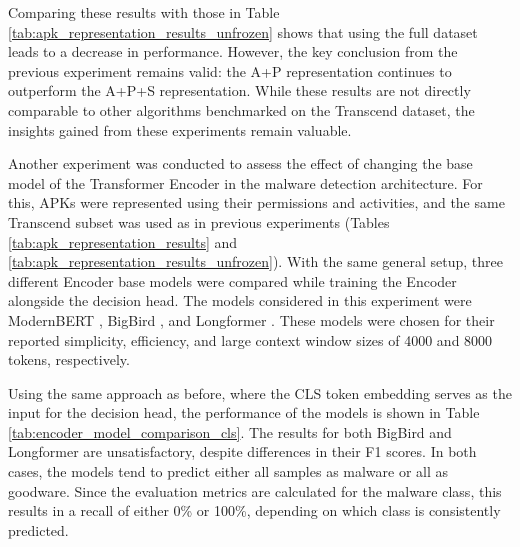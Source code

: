 Comparing these results with those in Table \ref{tab:apk_representation_results_unfrozen} shows that using the 
full dataset leads to a decrease in performance.
However, the key conclusion from the previous experiment remains valid: the A+P representation continues 
to outperform the A+P+S representation.
While these results are not directly comparable to other algorithms benchmarked on the Transcend dataset, 
the insights gained from these experiments remain valuable.

Another experiment was conducted to assess the effect of changing the 
base model of the Transformer Encoder in the malware detection architecture.
For this, APKs were represented using their permissions and activities, 
and the same Transcend subset was used as in previous experiments 
(Tables \ref{tab:apk_representation_results} and \ref{tab:apk_representation_results_unfrozen}).
With the same general setup, three different Encoder base models were compared while training 
the Encoder alongside the decision head.
The models considered in this experiment were ModernBERT \cite{modernbert}, BigBird \cite{bigbird}, 
and Longformer \cite{longformer}.
These models were chosen for their reported simplicity, efficiency, 
and large context window sizes of 4000 and 8000 tokens, respectively.

Using the same approach as before, where the CLS token embedding serves as the input for the decision head, 
the performance of the models is shown in Table \ref{tab:encoder_model_comparison_cls}.
The results for both BigBird and Longformer are unsatisfactory, despite differences in their F1 scores.
In both cases, the models tend to predict either all samples as malware or all as goodware.
Since the evaluation metrics are calculated for the malware class, this results in a recall of 
either 0\% or 100\%, depending on which class is consistently predicted.

